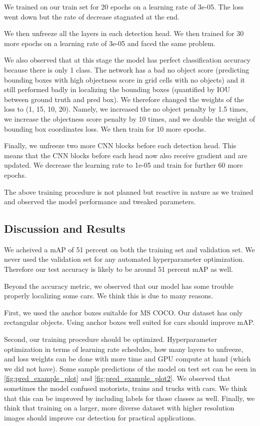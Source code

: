 \documentclass[10pt,twocolumn,letterpaper]{article}
\begin{document}
We trained on our train set for 20 epochs on a learning rate of 3e-05.  The loss went down but the rate of decrease stagnated at the end. 

We then unfreeze all the layers in each detection head. We then trained for 30 more epochs on a learning rate of 3e-05 and faced the same problem. 

We also observed that at this stage the model has perfect classification accuracy because there is only 1 class. The network has a bad no object score (predicting bounding boxes with high objectness score in grid cells with no objects) and it still performed badly in localizing the bounding boxes (quantified by IOU between ground truth and pred box). We therefore changed the weights of the loss to (1, 15, 10, 20). Namely, we increased the no object penalty by 1.5 times, we increase the objectness score penalty by 10 times, and we double the weight of bounding box coordinates loss. We then train for 10 more epochs.

Finally, we unfreeze two more CNN blocks before each detection head. This means that the CNN blocks before each head now also receive gradient and are updated. We decrease the learning rate to 1e-05 and train for further 60 more epochs. 

The above training procedure is not planned but reactive in nature as we trained and observed the model performance and tweaked parameters. 

\subsection{Discussion and Results}
We acheived a mAP of 51 percent on both the training set and validation set. We never used the validation set for any automated hyperparameter optimization. Therefore our test accuracy is likely to be around 51 percent mAP as well. 

Beyond the accuracy metric, we observed that our model has some trouble properly localizing some cars. We think this is due to many reasons.

First, we used the anchor boxes suitable for MS COCO. Our dataset has only rectangular objects. Using anchor boxes well suited for cars should improve mAP. 

Second, our training procedure should be optimized. Hyperparameter optimization in terms of learning rate schedules, how many layers to unfreeze, and loss weights can be done with more time and GPU compute at hand (which we did not have). Some sample predictions of the model on test set can be seen in \ref{fig:pred_example_plot} and \ref{fig:pred_example_plot2}. We observed that sometimes the model confused motorists, trains and trucks with cars. We think that this can be improved by including labels for those classes as well. Finally, we think that training on a larger, more diverse dataset with higher resolution images should improve car detection for practical applications.
\end{document}
